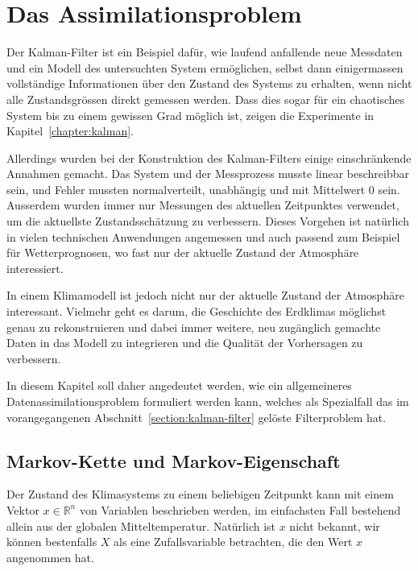 %
%
%
\section{Das Assimilationsproblem\label{section:assimilationsproblem}}
Der Kalman-Filter ist ein Beispiel dafür, wie laufend anfallende neue
Messdaten und
ein Modell des untersuchten System ermöglichen, selbst dann einigermassen
vollständige Informationen über den Zustand des Systems zu erhalten, wenn
nicht alle Zustandsgrössen direkt gemessen werden.
Dass dies sogar für ein chaotisches System bis zu einem gewissen Grad
möglich ist, zeigen die Experimente in Kapitel~\ref{chapter:kalman}.

Allerdings wurden bei der Konstruktion des Kalman-Filters einige
einschränkende Annahmen gemacht.
Das System und der Messprozess musste linear beschreibbar sein, 
und Fehler mussten normalverteilt, unabhängig und mit Mittelwert $0$ sein.
Ausserdem wurden immer nur Messungen des aktuellen Zeitpunktes verwendet,
um die aktuellste Zustandsschätzung zu verbessern.
Dieses Vorgehen ist natürlich in vielen technischen Anwendungen angemessen
und auch passend zum Beispiel für Wetterprognosen, wo fast nur der aktuelle
Zustand der Atmosphäre interessiert.

In einem Klimamodell ist jedoch nicht nur der aktuelle Zustand der Atmosphäre
interessant.
Vielmehr geht es darum, die Geschichte des Erdklimas möglichst genau
zu rekonstruieren und dabei immer weitere, neu zugänglich gemachte 
Daten in das Modell zu integrieren und die Qualität der Vorhersagen zu
verbessern.

In diesem Kapitel soll daher angedeutet werden, wie ein allgemeineres
Datenassimilationsproblem formuliert werden kann, welches als Spezialfall
das im vorangegangenen Abschnitt~\ref{section:kalman-filter} gelöste
Filterproblem hat.

\subsection{Markov-Kette und Markov-Eigenschaft\label{subsection:markov}}
Der Zustand des Klimasystems zu einem beliebigen Zeitpunkt kann mit einem
Vektor $x\in\mathbb R^n$ von Variablen beschrieben werden, im einfachsten
Fall bestehend allein aus der globalen Mitteltemperatur.
Natürlich ist $x$ nicht bekannt, wir können bestenfalls $X$ als eine
Zufallsvariable betrachten, die den Wert $x$ angenommen hat.

